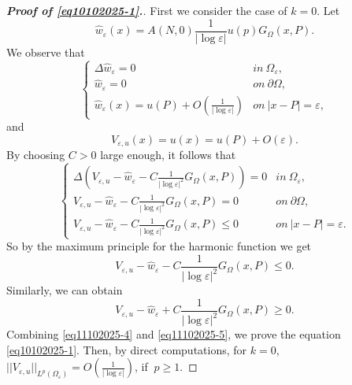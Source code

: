 \documentclass[11pt,reqno]{article}
\numberwithin{equation}{section}
\newcommand\e\varepsilon
\renewcommand\O\Omega
\begin{document}
	\begin{proof}[\bf Proof of \eqref{eq10102025-1}.]
    First we consider the case of $k=0$.
	    Let 
        \begin{equation}
             \hat{w}_\e(x)=A(N,0)\frac{1}{|\log \e|}u(p)G_\Omega(x,P).
        \end{equation}
        We observe that 
       $$
       \begin{cases}
           \Delta \hat{w}_\e=0&in\ \O_\e,\\
					\hat{w}_\e=0&on\ \partial\O,\\
             \hat{w}_\e(x)=u(P)+O\left(\frac{1}{|\log \e|}\right)&on\ |x-P|=\e,
       \end{cases}
       $$
        and 
        \begin{equation}
            V_{\e,u}(x)=u(x)=u(P)+O(\e).
        \end{equation}
        By choosing $C>0$ large enough, it follows that
        \begin{equation}
            \begin{cases}
                 \Delta\left(V_{\e,u}- \hat{w}_\e-C\frac{1}{|\log \e|^2}G_\Omega(x,P)\right)=0&in\ \O_\e,\\
					V_{\e,u}- \hat{w}_\e-C\frac{1}{|\log \e|^2}G_\Omega(x,P)=0&on\ \partial\O,\\
                    V_{\e,u}- \hat{w}_\e-C\frac{1}{|\log \e|^2}G_\Omega(x,P)\leq 0 & on \ |x-P|=\e.
            \end{cases}
        \end{equation}
        So by the maximum principle for the harmonic function we get
        \begin{equation}\label{eq11102025-4}
             V_{\e,u}- \hat{w}_\e-C\frac{1}{|\log \e|^2}G_\Omega(x,P)\leq 0.
        \end{equation}
        Similarly, we can obtain  
         \begin{equation}\label{eq11102025-5}
             V_{\e,u}- \hat{w}_\e+C\frac{1}{|\log \e|^2}G_\Omega(x,P)\ge 0.
        \end{equation}
        Combining \eqref{eq11102025-4} and \eqref{eq11102025-5}, we prove the equation \eqref{eq10102025-1}.
        Then, by direct computations, for $k=0$, $||V_{\e,u}||_{L^p(\O_\e)}=O\left(\frac{1}{|\log \e|}\right) $, if $ \ p\ge 1.$
        

\end{proof}
\end{document}
